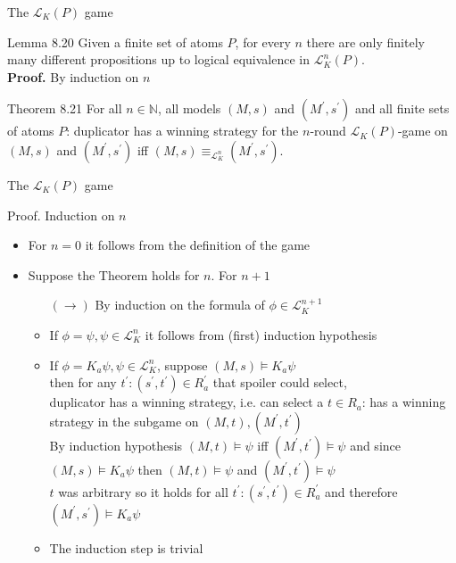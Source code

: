 \documentclass{beamer}
\newcommand{\lang}{\mathcal{L}}
\begin{document}
\begin{frame}{The $\lang_K(P)$ game}
	\begin{block}{Lemma 8.20}
		Given a finite set of atoms $P$, for every $n$ there are only finitely many different propositions up to logical equivalence in $\lang_K^n(P)$.\\
		\textbf{Proof.} By induction on $n$
	\end{block} \pause
	\begin{block}{Theorem 8.21}
		For all $n \in \mathbb{N}$, all models $(M,s)$ and $(M^\prime,s^\prime)$ and all finite sets of atoms $P$: duplicator has a winning strategy for the $n$-round $\lang_K(P)$-game on $(M,s)$ and $(M^\prime,s^\prime)$ iff $(M,s) \equiv_{\lang_K^n} (M^\prime,s^\prime)$.
	\end{block}
\end{frame}

\begin{frame}{The $\lang_K(P)$ game}
	\begin{block}{Proof.}
		Induction on $n$
		\begin{itemize}
			\item For $n=0$ it follows from the definition of the game
			\item Suppose the Theorem holds for $n$. For $n+1$
				\begin{small}
				\begin{itemize}
					\item[$(\rightarrow)$] By induction on the formula of $\phi \in \lang_K^{n+1}$
					\item If $\phi=\psi, \psi \in \lang_K^n$ it follows from (first) induction hypothesis
					\item If $\phi=K_a \psi, \psi \in \lang_K^n$, suppose $(M,s) \models K_a \psi$\\
						then for any $t^\prime: (s^\prime,t^\prime) \in R_a^\prime$ that spoiler could select,\\
						duplicator has a winning strategy, i.e. can select a $t \in R_a$: has a winning strategy in the subgame on $(M,t),(M^\prime,t^\prime)$\\[4pt]
						By induction hypothesis $(M,t) \models \psi$ iff $(M^\prime,t^\prime) \models \psi$ and since $(M,s) \models K_a \psi$ then $(M,t) \models \psi$ and $(M^\prime,t^\prime) \models \psi$\\
						$t$ was arbitrary so it holds for all $t^\prime:(s^\prime,t^\prime) \in R_a^\prime$ and therefore $(M^\prime,s^\prime) \models K_a \psi$
					\item The induction step is trivial
				\end{itemize}
				\end{small}
		\end{itemize}
	\end{block}
\end{frame}
\end{document}
